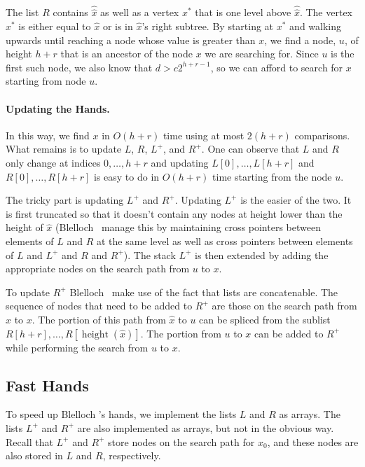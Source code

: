 \documentclass{patmorin}
\DeclareMathOperator{\hgt}{height}
\begin{document}
The list $R$ contains $\hat{\hat x}$ as well as a vertex $x^*$ that is one
level above $\hat{\hat x}$.  The vertex $x^*$ is either equal to $\hat
x$ or is in $\hat x$'s right subtree.  By starting at $x^*$ and walking
upwards until reaching a node whose value is greater than $x$, we find
a node, $u$, of height $h+r$ that is an ancestor of the node $x$ we are
searching for.  Since $u$ is the first such node, we also know that $d >
c2^{h+r-1}$, so we can afford to search for $x$ starting from node $u$.

\paragraph{Updating the Hands.}
In this way, we find $x$ in $O(h+r)$ time using at most $2(h+r)$
comparisons.  What remains is to update $L$, $R$, $L^+$, and $R^+$.
One can observe that $L$ and $R$ only change at indices $0,\ldots,h+r$
and updating $L[0],\ldots,L[h+r]$ and $R[0],\ldots,R[h+r]$ is easy to
do in $O(h+r)$ time starting from the node $u$.

The tricky part is updating $L^+$ and $R^+$.  Updating $L^+$ is the
easier of the two.  It is first truncated so that it doesn't contain
any nodes at height lower than the height of $\hat x$ (Blelloch \etal\
manage this by maintaining cross pointers between elements of $L$ and
$R$ at the same level as well as cross pointers between elements of $L$
and $L^+$ and $R$ and $R^+$). The stack $L^+$ is then extended by adding
the appropriate nodes on the search path from $u$ to $x$.

To update $R^+$ Blelloch \etal\ make use of the fact that lists are
concatenable. The sequence of nodes that need to be added to $R^+$
are those on the search path from $\hat x$ to $x$.  The portion
of this path from $\hat x$ to $u$ can be spliced from the sublist
$R[h+r],\ldots,R[\hgt(\hat{x})]$. The portion from $u$ to $x$ can be
added to $R^+$ while performing the search from $u$ to $x$.

\subsection{Fast Hands}

To speed up Blelloch \etal's hands, we implement the lists $L$ and $R$
as arrays.  The lists $L^+$ and $R^+$ are also implemented as arrays,
but not in the obvious way.  Recall that $L^+$ and $R^+$ store nodes
on the search path for $x_0$, and these nodes are also stored in $L$
and $R$, respectively.
\end{document}
